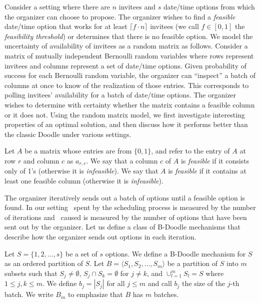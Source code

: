 Consider a setting where there are $n$ invitees and $s$ date/time options from which the organizer can choose to propose. The organizer wishes to find a {\em feasible} date/time option that works for at least $\lceil f \cdot n \rceil$ invitees (we call $f\in [0,1]$ the {\em feasibility threshold}) or determines that there is no feasible option.
We model the uncertainty of availability of invitees as a random matrix as follows.
Consider a matrix of mutually independent Bernoulli random variables where rows represent invitees and columns represent a set of date/time options. 
Given probability of success for each Bernoulli random variable, the organizer can ``inspect'' a batch of columns at once to know of the realization of those entries. This corresponds to polling invitees' availability for a batch of date/time options. The organizer wishes to determine with certainty whether the matrix contains a feasible column or it does not. Using the random matrix model, we first investigate interesting properties of an optimal solution, and then discuss how it performs better than the classic Doodle under various settings.

 \begin{definition}[Feasibility]
 Let $A$ be a matrix whose entries are from $\{0,1\}$, and refer to the entry of $A$ at row $r$ and column $c$ as $a_{r,c}$.
 We say that a column $c$ of $A$ is {\em feasible} if it consists only of 1's (otherwise it is {\em infeasible}). 
 We say that $A$ is {\em feasible} if it contains at least one feasible column (otherwise it is {\em infeasible}).
 \end{definition}

The organizer iteratively sends out a batch of options until a feasible option is found. In our setting \Time\ spent by the scheduling process is measured by the number of iterations and \Inconvenience\ caused is measured by the number of options that have been sent out by the organizer.
Let us define a class of B-Doodle mechanisms that describe how the organizer sends out options in each iteration.
\begin{definition}\label{bdoodle:def:BDoodleMechanism}
Let $S = \{1, 2, \dots, s\}$ be a set of $s$ options.
We define a B-Doodle mechanism for $S$ as an ordered partition of $S$.
Let $B = \langle S_1, S_2, \dots, S_m \rangle$ be a partition of $S$ into $m$ subsets such that $S_j \neq\emptyset$, $S_j \cap S_k = \emptyset$ for $j \neq k$, and $\cup_{l=1}^{m} S_l = S$ where $1 \leq j,k \leq m$.
We define $b_j = |S_j|$ for all $j \leq m$ and call $b_j$ the size of the $j$-th batch.
We write $B_m$ to emphasize that $B$ has $m$ batches.
\end{definition}

